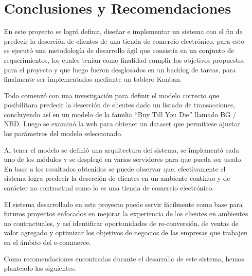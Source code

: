 
\chapter{Conclusiones y Recomendaciones}

En este proyecto se logró definir, diseñar e implementar un sistema con el fin de predecir la deserción de clientes de una tienda de comercio electrónico, para esto se ejecutó una metodología de desarrollo ágil que consistía en un conjunto de requerimientos, los cuales tenían como finalidad cumplir los objetivos propuestos para el proyecto y que luego fueron desglosados en un backlog de tareas, para finalmente ser implementadas mediante un tablero Kanban.

	Todo comenzó con una investigación para definir el modelo correcto que posibilitara predecir la deserción de clientes dado un listado de transacciones, concluyendo así en un modelo de la familia “Buy Till You Die” llamado BG / NBD. Luego se examinó la web para obtener un dataset que permitiese ajustar los parámetros  del modelo seleccionado.

	Al tener el modelo se definió una arquitectura del sistema, se implementó cada uno de los módulos y se desplegó en varios servidores para que pueda ser usado. En base a los resultados obtenidos se puede observar que, efectivamente el sistema logra predecir la deserción de clientes en un ambiente continuo y de carácter no contractual como lo es una tienda de comercio electrónico.

	El sistema desarrollado en este proyecto puede servir fácilmente como base para futuros proyectos enfocados en mejorar la experiencia de los clientes en ambientes no contractuales, y así  identificar oportunidades de re-conversión, de ventas de valor agregado y optimizar los objetivos de negocios de las empresas que trabajen en el ámbito del e-commerce.
	
	Como recomendaciones encontradas durante el desarrollo de este sistema, hemos planteado las siguientes:

